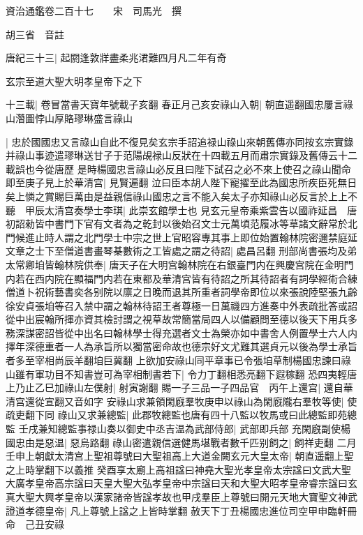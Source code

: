 資治通鑑卷二百十七　　宋　司馬光　撰

胡三省　音註

唐紀三十三|{
	起閼逢敦牂盡柔兆涒難四月凡二年有奇}


玄宗至道大聖大明孝皇帝下之下

十三載|{
	卷冒當書天寶年號載子亥翻}
春正月己亥安祿山入朝|{
	朝直遥翻國忠屢言祿山濳圖悖山厚賂璆琳盛言祿山}


|{
	忠於國國忠又言祿山自此不復見矣玄宗手詔追禄山祿山來朝舊傳亦同按玄宗實錄并祿山事迹遣璆琳送甘子于范陽覘禄山反狀在十四載五月而肅宗實錄及舊傳云十二載誤也今從唐歷}
是時楊國忠言祿山必反且曰陛下試召之必不來上使召之祿山聞命即至庚子見上於華清宫|{
	見賢遍翻}
泣曰臣本胡人陛下寵擢至此為國忠所疾臣死無日矣上憐之賞賜巨萬由是益親信祿山國忠之言不能入矣太子亦知祿山必反言於上上不聽　甲辰太清宫奏學士李琪|{
	此崇玄館學士也}
見玄元皇帝乘紫雲告以國祚延昌　唐初詔勑皆中書門下官有文者為之乾封以後始召文士元萬頃范履冰等草諸文辭常於北門候進止時人謂之北門學士中宗之世上官昭容專其事上即位始置翰林院密邇禁庭延文章之士下至僧道書畫琴棊數術之工皆處之謂之待詔|{
	處昌呂翻}
刑部尚書張均及弟太常卿垍皆翰林院供奉|{
	唐天子在大明宫翰林院在右銀臺門内在興慶宫院在金明門内若在西内院在顯福門内若在東都及華清宫皆有待詔之所其待詔者有詞學經術合練僧道卜祝術藝書奕各别院以廪之日晚而退其所重者詞學帝即位以來張說陸堅張九齡徐安貞張垍等召入禁中謂之翰林待詔王者尊極一日萬禨四方進奏中外表疏批答或詔從中出宸翰所揮亦資其檢討謂之視草故常簡當局四人以備顧問至德以後天下用兵多務深謀密詔皆從中出名曰翰林學士得充選者文士為榮亦如中書舍人例置學士六人内擇年深德重者一人為承旨所以獨當密命故也德宗好文尤難其選貞元以後為學士承旨者多至宰相尚辰羊翻垍巨冀翻}
上欲加安祿山同平章事已令張垍草制楊國忠諫曰祿山雖有軍功目不知書豈可為宰相制書若下|{
	令力丁翻相悉亮翻下遐稼翻}
恐四夷輕唐上乃止乙巳加祿山左僕射|{
	射寅謝翻}
賜一子三品一子四品官　丙午上還宫|{
	還自華清宫還從宣翻又音如字}
安祿山求兼領閑廐羣牧庚申以祿山為閑廐隴右羣牧等使|{
	使疏吏翻下同}
祿山又求兼總監|{
	此郡牧總監也唐有四十八監以牧馬或曰此總監即苑總監}
壬戌兼知總監事禄山奏以御史中丞吉温為武部侍郎|{
	武部即兵部}
充閑廐副使楊國忠由是惡温|{
	惡烏路翻}
祿山密遣親信選健馬堪戰者數千匹别飼之|{
	飼祥吏翻}
二月壬申上朝獻太清宫上聖祖尊號曰大聖祖高上大道金闕玄元大皇太帝|{
	朝直遥翻上聖之上時掌翻下以義推}
癸酉享太廟上高祖諡曰神堯大聖光孝皇帝太宗諡曰文武大聖大廣孝皇帝高宗諡曰天皇大聖大弘孝皇帝中宗諡曰天和大聖大昭孝皇帝睿宗諡曰玄真大聖大興孝皇帝以漢家諸帝皆諡孝故也甲戌羣臣上尊號曰開元天地大寶聖文神武證道孝德皇帝|{
	凡上尊號上諡之上皆時掌翻}
赦天下丁丑楊國忠進位司空甲申臨軒冊命　己丑安祿

